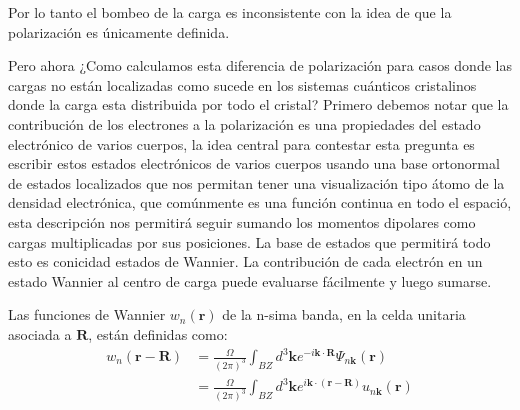 Por lo tanto el bombeo de la carga es inconsistente con la idea de que la polarización es únicamente  definida. 

Pero ahora ¿Como calculamos esta diferencia de polarización para casos donde las cargas no están localizadas como sucede en los sistemas cuánticos cristalinos donde la carga esta distribuida por todo el cristal? Primero debemos notar que la contribución de los electrones a la polarización es una propiedades del estado electrónico de varios cuerpos, la idea central para contestar esta pregunta es escribir estos estados electrónicos de varios cuerpos usando una base ortonormal  de estados localizados que nos permitan tener una visualización tipo átomo de la densidad electrónica, que comúnmente es una función continua en todo el espació, esta descripción nos permitirá seguir sumando los momentos dipolares como cargas multiplicadas por sus posiciones. La base de estados que permitirá todo esto es conicidad estados de Wannier. La contribución de cada electrón en un estado Wannier al centro de carga puede evaluarse fácilmente y luego sumarse.

Las funciones de Wannier $w_n(\textbf{r})$ de la n-sima banda, en la celda unitaria asociada a $\textbf{R}$, están definidas como:
\begin{equation}
\begin{split}
     w_n(\textbf{r} - \textbf{R}) &= \frac{\Omega}{(2\pi)^3} \int_{BZ} d^3\textbf{k} e^{-i \textbf{k} \cdot \textbf{R}} \Psi_{n\textbf{k}}(\textbf{r})\\
     &= \frac{\Omega}{(2\pi)^3} \int_{BZ} d^3\textbf{k} e^{i \textbf{k} \cdot (\textbf{r} - \textbf{R})} u_{n\textbf{k}}(\textbf{r})
\end{split}
\end{equation}

